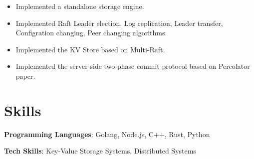 \documentclass{wenycv}
\begin{document}
\begin{itemize}
  \item Implemented a standalone storage engine.
  \item Implemented Raft Leader election, Log replication, Leader transfer, Configration changing, Peer changing algorithms.
  \item Implemented the KV Store based on Multi-Raft.
  \item Implemented the server-side two-phase commit protocol based on Percolator paper.
\end{itemize}

\section{Skills}

\begin{compactlist}
  \item \textbf{Programming Languages}: Golang, Node.js, C++, Rust, Python 
  \item \textbf{Tech Skills}: Key-Value Storage Systems, Distributed Systems
\end{compactlist}
\end{document}
